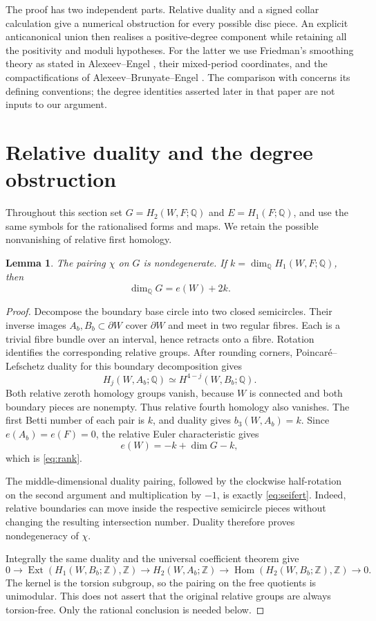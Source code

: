 \documentclass[11pt]{article}
\newtheorem{lemma}[theorem]{Lemma}
\theoremstyle{definition}
\theoremstyle{remark}
\newcommand{\Z}{\mathbb Z}
\newcommand{\Q}{\mathbb Q}
\newcommand{\Hom}{\operatorname{Hom}}
\newcommand{\Ext}{\operatorname{Ext}}
\begin{document}
The proof has two independent parts. Relative duality and a signed collar calculation give a numerical obstruction for every possible disc piece. An explicit anticanonical union then realises a positive-degree component while retaining all the positivity and moduli hypotheses. For the latter we use Friedman's smoothing theory as stated in Alexeev--Engel \cite[Theorem~3.5 and \S7A]{AE}, their mixed-period coordinates, and the compactifications of Alexeev--Brunyate--Engel \cite{ABE}. The comparison with \cite{GT} concerns its defining conventions; the degree identities asserted later in that paper are not inputs to our argument.

\section{Relative duality and the degree obstruction}

Throughout this section set $G=H_2(W,F;\Q)$ and $E=H_1(F;\Q)$, and use the same symbols for the rationalised forms and maps. We retain the possible nonvanishing of relative first homology.

\begin{lemma}\label{lem:duality}
The pairing $\chi$ on $G$ is nondegenerate. If $k=\dim_{\Q}H_1(W,F;\Q)$, then
\begin{equation}\label{eq:rank}
\dim_{\Q}G=e(W)+2k.
\end{equation}
\end{lemma}
\begin{proof}
Decompose the boundary base circle into two closed semicircles. Their inverse images $A_b,B_b\subset\partial W$ cover $\partial W$ and meet in two regular fibres. Each is a trivial fibre bundle over an interval, hence retracts onto a fibre. Rotation identifies the corresponding relative groups. After rounding corners, Poincar\'e--Lefschetz duality for this boundary decomposition gives
\[
H_j(W,A_b;\Q)\simeq H^{4-j}(W,B_b;\Q).
\]
Both relative zeroth homology groups vanish, because $W$ is connected and both boundary pieces are nonempty. Thus relative fourth homology also vanishes. The first Betti number of each pair is $k$, and duality gives $b_3(W,A_b)=k$. Since $e(A_b)=e(F)=0$, the relative Euler characteristic gives
\[
e(W)=-k+\dim G-k,
\]
which is \eqref{eq:rank}.

The middle-dimensional duality pairing, followed by the clockwise half-rotation on the second argument and multiplication by $-1$, is exactly \eqref{eq:seifert}. Indeed, relative boundaries can move inside the respective semicircle pieces without changing the resulting intersection number. Duality therefore proves nondegeneracy of $\chi$.

Integrally the same duality and the universal coefficient theorem give
\[
0\longrightarrow\Ext(H_1(W,B_b;\Z),\Z)
\longrightarrow H_2(W,A_b;\Z)
\longrightarrow\Hom(H_2(W,B_b;\Z),\Z)\longrightarrow0.
\]
The kernel is the torsion subgroup, so the pairing on the free quotients is unimodular. This does not assert that the original relative groups are always torsion-free. Only the rational conclusion is needed below.
\end{proof}
\end{document}
